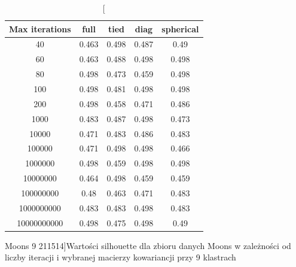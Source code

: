 \documentclass{classrep}
\begin{document}
{{\begin{table}[]
                \begin{minipage}{1\textwidth}
                \centering
                \begin{tabular}{|c|c|c|c|c|}
                \hline
                Max iterations & full & tied & diag & spherical \\ \hline
                40 & 0.463 & 0.498 & 0.487 & 0.49 \\ \hline
                60 & 0.463 & 0.488 & 0.498 & 0.498 \\ \hline
                80 & 0.498 & 0.473 & 0.459 & 0.498 \\ \hline
                100 & 0.498 & 0.481 & 0.498 & 0.498 \\ \hline
                200 & 0.498 & 0.458 & 0.471 & 0.486 \\ \hline
                1000 & 0.483 & 0.487 & 0.498 & 0.473 \\ \hline
                10000 & 0.471 & 0.483 & 0.486 & 0.483 \\ \hline
                100000 & 0.471 & 0.498 & 0.498 & 0.466 \\ \hline
                1000000 & 0.498 & 0.459 & 0.498 & 0.498 \\ \hline
                10000000 & 0.464 & 0.498 & 0.459 & 0.459 \\ \hline
                100000000 & 0.48 & 0.463 & 0.471 & 0.483 \\ \hline
                1000000000 & 0.483 & 0.483 & 0.498 & 0.483 \\ \hline
                10000000000 & 0.498 & 0.475 & 0.498 & 0.49 \\ \hline
                \end{tabular}
                \caption
                [Moons 9 211514]{Wartości silhouette dla zbioru danych Moons w zależności od liczby iteracji i wybranej macierzy kowariancji przy 9 klastrach}
                \label{Moons_9_211514}
                \end{minipage}
                \hfill

            \end{table}
            
}}
\end{document}
